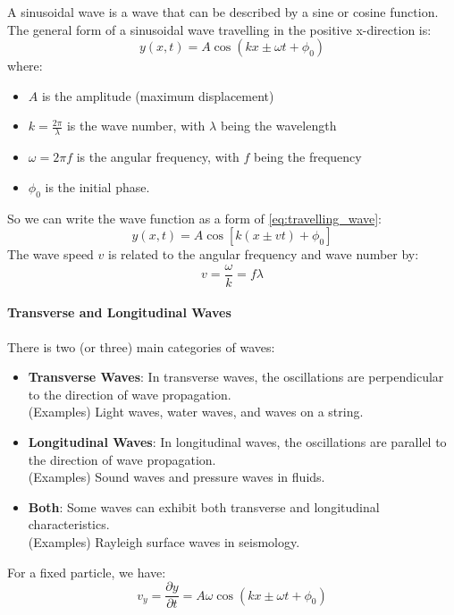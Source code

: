 \documentclass[11pt]{report}
\begin{document}
\begin{definition}
    A sinusoidal wave is a wave that can be described by a sine or cosine function. The general form of a sinusoidal wave travelling in the positive x-direction is:
    \begin{equation}
        y(x,t) = A \cos(kx \pm \omega t + \phi_0)
    \end{equation}
    where:
    \begin{itemize}
        \item \( A \) is the amplitude (maximum displacement)
        \item \( k = \frac{2\pi}{\lambda} \) is the wave number, with \( \lambda \) being the wavelength
        \item \( \omega = 2\pi f \) is the angular frequency, with \( f \) being the frequency
        \item \( \phi _0 \) is the initial phase.
    \end{itemize}
    So we can write the wave function as a form of \eqref{eq:travelling_wave}:
    \begin{equation}
        y(x,t) = A \cos\left[k(x \pm vt) + \phi_0\right]
    \end{equation}
    The wave speed \( v \) is related to the angular frequency and wave number by:
    \begin{equation}
        v = \frac{\omega}{k} = f\lambda
    \end{equation}
\end{definition}

\paragraph{Transverse and Longitudinal Waves} There is two (or three) main categories of waves:
\begin{itemize}
    \item \textbf{Transverse Waves}: In transverse waves, the oscillations are perpendicular to the direction of wave propagation. \\
    (Examples) Light waves, water waves, and waves on a string.
    \item \textbf{Longitudinal Waves}: In longitudinal waves, the oscillations are parallel to the direction of wave propagation. \\
    (Examples) Sound waves and pressure waves in fluids.
    \item \textbf{Both}: Some waves can exhibit both transverse and longitudinal characteristics. \\
    (Examples) Rayleigh surface waves in seismology.
\end{itemize}
\begin{definition}
    For a fixed particle, we have:
    \begin{equation}
        v_y = \frac{\partial y}{\partial t} = A \omega \cos(kx \pm \omega t + \phi_0)
    \end{equation}
\end{definition}
\end{document}
